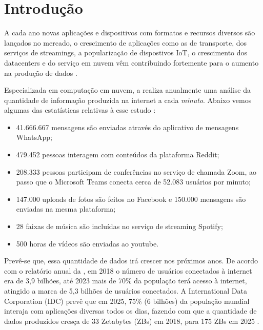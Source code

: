 \chapter{Introdução}
\label{chp:introduction}

A cada ano novas aplicações e dispositivos com formatos e recursos diversos são lançados no mercado, o crescimento de aplicações como as de transporte, dos serviços de streamings, a popularização de  dispostivos IoT, o crescimento dos datacenters e do serviço em nuvem vêm contribuindo fortemente para o aumento na produção de dados \citep{relatorio-idc}.

Especializada em computação em nuvem, a \citeauthor{domo-study} realiza anualmente uma análise da quantidade de informação produzida na internet  a cada \textit{minuto}. Abaixo vemos algumas das estatísticas relativas à esse estudo \citep{domo-study}:

\begin{itemize}
    \item 41.666.667 mensagens são enviadas através do aplicativo de mensagens WhatsApp;
    \item 479.452 pessoas interagem com conteúdos da plataforma Reddit;
    \item 208.333 pessoas participam de conferências no serviço de chamada Zoom, ao passo que o Microsoft Teams conecta cerca de 52.083 usuários por minuto;
    \item 147.000 uploads de fotos são feitos no Facebook e 150.000 mensagens são enviadas na mesma plataforma;
    \item 28 faixas de música são incluídas no serviço de streaming Spotify;
    \item 500 horas de vídeos são enviadas ao youtube.
\end{itemize}

Prevê-se que, essa quantidade de dados irá crescer nos próximos anos. De acordo com o relatório anual da \citet{relatorio-cisco}, em 2018 o número de usuários conectados à internet era de 3,9 bilhões, até 2023 mais de 70\% da população terá acesso à internet, atingido a marca de 5,3 bilhões de usuários conectados. A International Data Corporation (IDC) prevê que em 2025, 75\% (6 bilhões) da população mundial interaja com aplicações diversas todos os dias, fazendo com que a quantidade de dados produzidos cresça de 33 Zetabytes (ZBs) em 2018, para 175 ZBs em 2025 \citep{relatorio-idc}.

